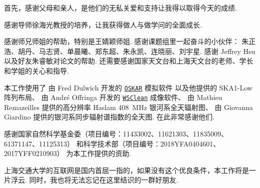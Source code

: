 
\begin{thanks}

首先，感谢父母和亲人，是他们的无私关爱和支持让我得以取得今天的成绩.

感谢导师徐海光教授的培养，让我获得做人与做学问的全面成长.

感谢师兄师姐的帮助，特别是王婧颖师姐.
感谢课题组里一起奋斗的小伙伴：
朱正浩、胡丹、马志贤、单晨曦、郑东超、朱永凯、连晓丽、刘宇星.
感谢 Jeffrey Hsu 以及好友朱睿敏对论文的帮助.
还需要感谢国家天文台和上海天文台的老师、学长和学姐的关心和指导.

本工作使用了
由 Fred Dulwich 开发的
\href{https://github.com/OxfordSKA/OSKAR}{\texttt{OSKAR}} 模拟软件
以及他提供的 SKA1-Low 阵列布局、
由 André Offringa 开发的
\href{https://sourceforge.net/projects/wsclean/}{\texttt{WSClean}} 成像软件、
由 Mathieu Remazeilles 提供的高分辨率 Haslam \SI{408}{\MHz} 银河系全天辐射图、
由 Giovanna Giardino 提供的银河系同步辐射谱指数的全天图.
在此非常感谢他们.

感谢国家自然科学基金委（项目编号：11433002、11621303、11835009、61371147、11125313）
和科学技术部（项目编号：2018YFA0404601、2017YFF0210903）
为本工作提供的资助.

上海交通大学的互联网是国内首屈一指的，如果没有这个优良条件，本工作将是一片浮云.
同时，我也将无法忘记在这里结识的一群好朋友.


\end{thanks}
